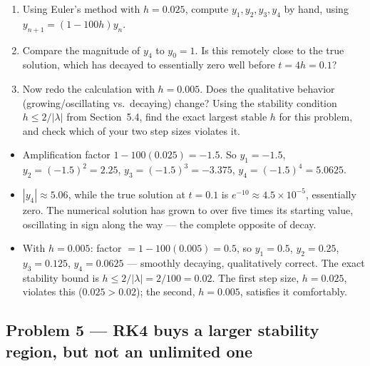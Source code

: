 \begin{enumerate}[label=(\alph*)]
\item Using Euler's method with $h=0.025$, compute $y_1, y_2, y_3, y_4$ by hand, using $y_{n+1}=(1-100h)y_n$.
\item Compare the magnitude of $y_4$ to $y_0=1$. Is this remotely close to the true solution, which has decayed to essentially zero well before $t=4h=0.1$?
\item Now redo the calculation with $h=0.005$. Does the qualitative behavior (growing/oscillating vs.\ decaying) change? Using the stability condition $h\le 2/|\lambda|$ from Section~5.4, find the exact largest stable $h$ for this problem, and check which of your two step sizes violates it.
\end{enumerate}

\solution
\begin{itemize}
\item[(a)] Amplification factor $1-100(0.025) = -1.5$. So $y_1=-1.5$, $y_2=(-1.5)^2=2.25$, $y_3=(-1.5)^3=-3.375$, $y_4=(-1.5)^4=5.0625$.
\item[(b)] $|y_4|\approx5.06$, while the true solution at $t=0.1$ is $e^{-10}\approx4.5\times10^{-5}$, essentially zero. The numerical solution has grown to over five times its starting value, oscillating in sign along the way --- the complete opposite of decay.
\item[(c)] With $h=0.005$: factor $=1-100(0.005)=0.5$, so $y_1=0.5$, $y_2=0.25$, $y_3=0.125$, $y_4=0.0625$ --- smoothly decaying, qualitatively correct. The exact stability bound is $h\le 2/|\lambda| = 2/100 = 0.02$. The first step size, $h=0.025$, violates this ($0.025>0.02$); the second, $h=0.005$, satisfies it comfortably.
\end{itemize}


\subsection*{Problem 5 --- RK4 buys a larger stability region, but not an unlimited one}

